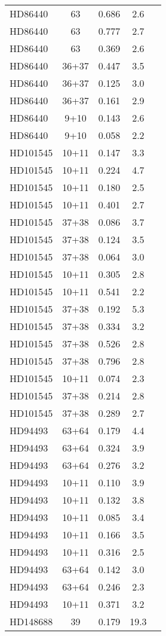 \begin{table*}
\begin{tabular}{l c c c c}
HD86440 & 63 & 0.686 & 2.6\\ 
HD86440 & 63 & 0.777 & 2.7\\ 
HD86440 & 63 & 0.369 & 2.6\\ 
HD86440 & 36+37 & 0.447 & 3.5\\ 
HD86440 & 36+37 & 0.125 & 3.0\\ 
HD86440 & 36+37 & 0.161 & 2.9\\ 
HD86440 & 9+10 & 0.143 & 2.6\\ 
HD86440 & 9+10 & 0.058 & 2.2\\ 
\hline
HD101545 & 10+11 & 0.147 & 3.3\\ 
HD101545 & 10+11 & 0.224 & 4.7\\ 
HD101545 & 10+11 & 0.180 & 2.5\\ 
HD101545 & 10+11 & 0.401 & 2.7\\ 
HD101545 & 37+38 & 0.086 & 3.7\\ 
HD101545 & 37+38 & 0.124 & 3.5\\ 
HD101545 & 37+38 & 0.064 & 3.0\\ 
HD101545 & 10+11 & 0.305 & 2.8\\ 
HD101545 & 10+11 & 0.541 & 2.2\\ 
HD101545 & 37+38 & 0.192 & 5.3\\ 
HD101545 & 37+38 & 0.334 & 3.2\\ 
HD101545 & 37+38 & 0.526 & 2.8\\ 
HD101545 & 37+38 & 0.796 & 2.8\\ 
HD101545 & 10+11 & 0.074 & 2.3\\ 
HD101545 & 37+38 & 0.214 & 2.8\\ 
HD101545 & 37+38 & 0.289 & 2.7\\ 
\hline
HD94493 & 63+64 & 0.179 & 4.4\\ 
HD94493 & 63+64 & 0.324 & 3.9\\ 
HD94493 & 63+64 & 0.276 & 3.2\\ 
HD94493 & 10+11 & 0.110 & 3.9\\ 
HD94493 & 10+11 & 0.132 & 3.8\\ 
HD94493 & 10+11 & 0.085 & 3.4\\ 
HD94493 & 10+11 & 0.166 & 3.5\\ 
HD94493 & 10+11 & 0.316 & 2.5\\ 
HD94493 & 63+64 & 0.142 & 3.0\\ 
HD94493 & 63+64 & 0.246 & 2.3\\ 
HD94493 & 10+11 & 0.371 & 3.2\\ 
\hline
HD148688 & 39 & 0.179 & 19.3\\ 

\end{tabular}
\end{table*}
